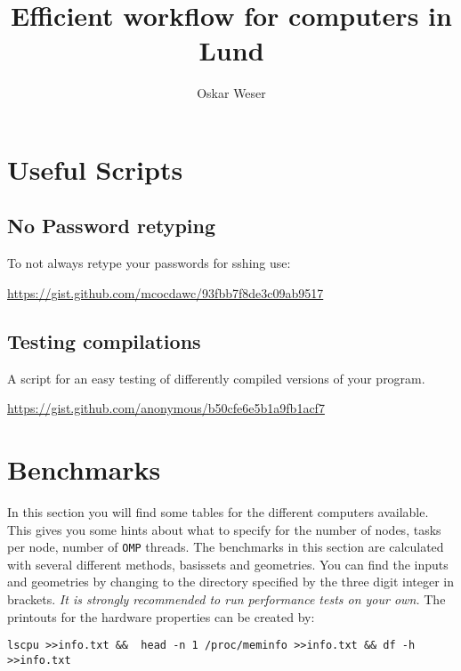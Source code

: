 \documentclass[12pt,a4paper,bibliography=totocnumbered,listof=totocnumbered]{scrartcl}
\begin{document}
\title{Efficient workflow for computers in Lund}
\date{}
\author{Oskar Weser}
\date{}
\maketitle
\subsection*{}

\thispagestyle{empty}

\tableofcontents
\thispagestyle{empty}
\newpage
\setcounter{page}{1}
%
\pagebreak

\section{Useful Scripts}
\subsection{No Password retyping}

To not always retype your passwords for sshing use:

\url{https://gist.github.com/mcocdawc/93fbb7f8de3c09ab9517}


\subsection{Testing compilations}

A script for an easy testing of differently compiled versions of your program.

\url{https://gist.github.com/anonymous/b50cfe6e5b1a9fb1acf7}


\section{Benchmarks}

In this section you will find some tables for the different computers available.
This gives you some hints about what to specify for the number of nodes, tasks per node, 
number of \verb!OMP! threads.
The benchmarks in this section are calculated with several different methods, basissets and geometries.
You can find the inputs and geometries by changing to the directory specified by the three digit integer in brackets.
\emph{It is strongly recommended to run performance tests on your own.}
The printouts for the hardware properties can be created by:

\verb!lscpu >>info.txt &&  head -n 1 /proc/meminfo >>info.txt && df -h >>info.txt!
\end{document}
